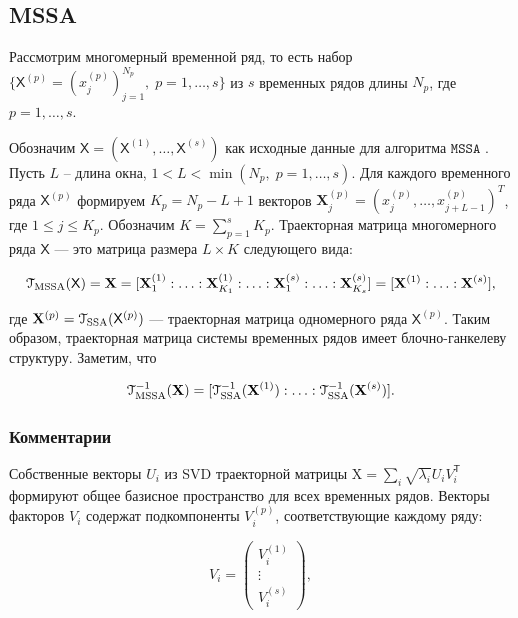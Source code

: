 \documentclass[12pt, specialist, subf
]{disser}
\theoremstyle{definition}
\newcommand{\SSA}{\texttt{SSA}}
\newcommand{\MSSA}{\texttt{MSSA}}
\newcommand{\DSSA}{\texttt{2d-SSA}}
\newcommand{\TS}{\mathsf{X}}
\begin{document}
\subsection{MSSA}
\label{sec:mssa}



Рассмотрим многомерный временной ряд, то есть набор $\{\TS^{(p)} = \left({x^{(p)}_{j}}\right) _{j=1}^{N_p}, \; p = 1, \ldots, s\}$ из $s$ временных рядов длины $N_p$, где $p = 1, \ldots, s$.

Обозначим $\TS = (\TS^{(1)}, \ldots, \TS^{(s)})$ как исходные данные для алгоритма $\MSSA$ \cite{ssa_with_R}. Пусть $L$ -- длина окна, $1 < L < \min(N_p, \; p = 1, \ldots, s)$. Для каждого временного ряда $\TS^{(p)}$ формируем $K_p = N_p - L + 1$ векторов $\mathbf{X}_j^{(p)} = (x_j^{(p)}, \ldots, x_{j+L-1}^{(p)})^T$, где $1 \leq j \leq K_p$. Обозначим $K = \sum_{p=1}^s K_p$. Траекторная матрица многомерного ряда $\TS$ — это матрица размера $L \times K$ следующего вида:

\[
	\EuScript{T}_{\text{MSSA}}(\TS) = \mathbf{X} = [\mathbf{X}_1^{(1)} : \ldots : \mathbf{X}_{K_1}^{(1)} : \ldots : \mathbf{X}_1^{(s)} : \ldots : \mathbf{X}_{K_s}^{(s)}] = [\mathbf{X}^{(1)} : \ldots : \mathbf{X}^{(s)}],
\]

где $\mathbf{X}^{(p)} = \EuScript{T}_{\text{SSA}}(\TS^{(p)})$ — траекторная матрица одномерного ряда $\TS^{(p)}$. Таким образом, траекторная матрица системы временных рядов имеет блочно-ганкелеву структуру. Заметим, что

\[
	\EuScript{T}^{-1}_{\text{MSSA}}(\mathbf{X}) = [\EuScript{T}^{-1}_{\text{SSA}}(\mathbf{X}^{(1)}) : \ldots : \EuScript{T}^{-1}_{\text{SSA}}(\mathbf{X}^{(s)})].
\]



\subsubsection{Комментарии}


Собственные векторы $U_i$ из SVD траекторной матрицы $\mathrm{X} = \sum_i \sqrt{\lambda_i} U_i V_i^{\mathsf{T}}$ формируют общее базисное пространство для всех временных рядов. Векторы факторов $V_i$ содержат подкомпоненты $V_i^{(p)}$, соответствующие каждому ряду:

\begin{equation*}
	V_i = \begin{pmatrix} V_i^{(1)} \\ \vdots \\ V_i^{(s)} \end{pmatrix},
\end{equation*}
\end{document}
